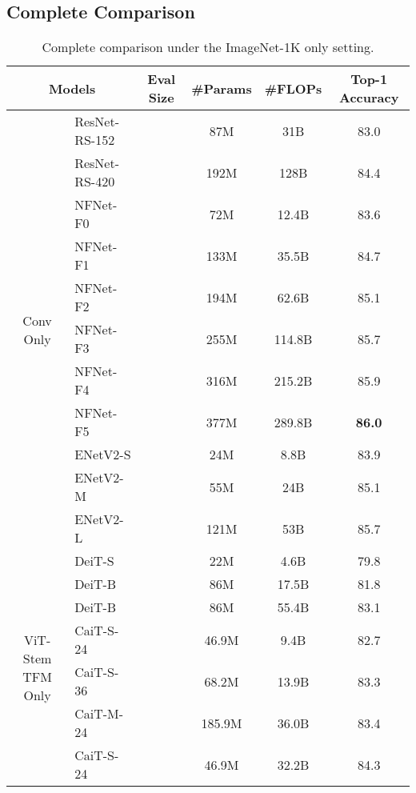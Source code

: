 \documentclass{article}
\begin{document}
\subsection{Complete Comparison}
\label{sec:appendix_complete_comparison}
\begin{table}[!ht]
\small
    \centering
    \caption{Complete comparison under the ImageNet-1K only setting.}
    \begin{tabular}{c l c c c c}
        \toprule
        \multicolumn{2}{c}{\bf Models} & \bf Eval Size & \bf \#Params & \bf \#FLOPs & \bf Top-1 Accuracy \\
        \midrule
        \multirow{11}{*}{Conv Only}
        & ResNet-RS-152 &  & 87M & 31B & 83.0 \\
        & ResNet-RS-420 &  & 192M & 128B & 84.4 \\
        \cmidrule(lr){2-2} \cmidrule(lr){3-3} \cmidrule(lr){4-5} \cmidrule(l){6-6}
        & NFNet-F0 &  & 72M  & 12.4B & 83.6 \\
        & NFNet-F1 &  & 133M & 35.5B & 84.7 \\
        & NFNet-F2 &  & 194M & 62.6B & 85.1 \\
        & NFNet-F3 &  & 255M & 114.8B & 85.7 \\
        & NFNet-F4 &  & 316M & 215.2B & 85.9 \\
        & NFNet-F5 &  & 377M & 289.8B & \bf 86.0 \\
        \cmidrule(lr){2-2} \cmidrule(lr){3-3} \cmidrule(lr){4-5} \cmidrule(l){6-6}
        & ENetV2-S &  & 24M  & 8.8B & 83.9 \\
        & ENetV2-M &  & 55M  & 24B & 85.1 \\
        & ENetV2-L &  & 121M & 53B & 85.7 \\
        \cmidrule(r){1-2} \cmidrule(lr){3-3} \cmidrule(lr){4-5} \cmidrule(l){6-6}
        \multirow{11}{*}{ViT-Stem TFM Only} 
        & DeiT-S  &  & 22M  & 4.6B & 79.8 \\
        & DeiT-B  &  & 86M  & 17.5B & 81.8 \\
        & DeiT-B  &  & 86M  & 55.4B & 83.1 \\
        \cmidrule(lr){2-2} \cmidrule(lr){3-3} \cmidrule(lr){4-5} \cmidrule(l){6-6}
        & CaiT-S-24 &  & 46.9M & 9.4B & 82.7 \\
        & CaiT-S-36 &  & 68.2M & 13.9B & 83.3 \\
        & CaiT-M-24 &  & 185.9M & 36.0B & 83.4 \\
        & CaiT-S-24 &  & 46.9M & 32.2B & 84.3 \\

\end{tabular}
\end{table}
\end{document}
